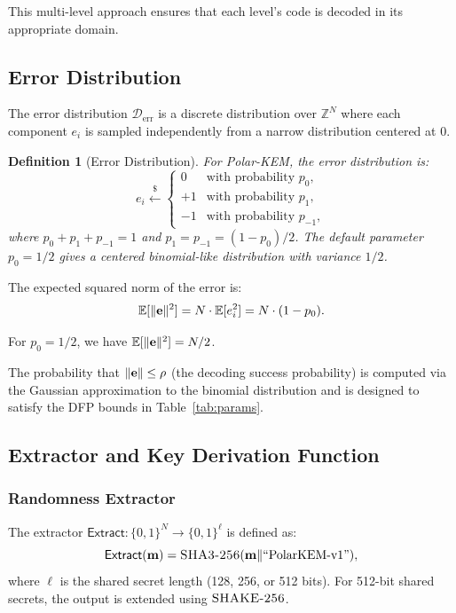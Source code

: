 \documentclass[11pt,a4paper]{article}
\newtheorem{definition}[theorem]{Definition}
\newcommand{\polarKem}{\textsf{Polar-KEM}\xspace}
\newcommand{\Extract}{\textsf{Extract}\xspace}
\newcommand{\DFP}{\textsf{DFP}\xspace}
\newcommand{\bit}{\{0,1\}}
\newcommand{\Z}{\mathbb{Z}}
\newcommand{\sample}{\xleftarrow{\$}}
\DeclarePairedDelimiter{\norm}{\lVert}{\rVert}
\begin{document}
This multi-level approach ensures that each level's code is decoded in its appropriate domain.

\subsection{Error Distribution}\label{sec:error-dist}

The error distribution $\mathcal{D}_{\text{err}}$ is a discrete distribution over $\Z^N$ where each component $e_i$ is sampled independently from a narrow distribution centered at 0.

\begin{definition}[Error Distribution]\label{def:error-dist}
For \polarKem, the error distribution is:
\[
e_i \sample \begin{cases}
0 & \text{with probability } p_0, \\
+1 & \text{with probability } p_1, \\
-1 & \text{with probability } p_{-1},
\end{cases}
\]
where $p_0 + p_1 + p_{-1} = 1$ and $p_1 = p_{-1} = (1 - p_0)/2$. The default parameter $p_0 = 1/2$ gives a centered binomial-like distribution with variance $1/2$.
\end{definition}

The expected squared norm of the error is:
\[
\mathbb{E}[\norm{\mathbf{e}}^2] = N \cdot \mathbb{E}[e_i^2] = N \cdot (1 - p_0).
\]

For $p_0 = 1/2$, we have $\mathbb{E}[\norm{\mathbf{e}}^2] = N/2$.

The probability that $\norm{\mathbf{e}} \leq \rho$ (the decoding success probability) is computed via the Gaussian approximation to the binomial distribution and is designed to satisfy the \DFP bounds in Table~\ref{tab:params}.

\subsection{Extractor and Key Derivation Function}\label{sec:extractor-kdf}

\subsubsection{Randomness Extractor}

The extractor $\Extract: \bit^N \to \bit^\ell$ is defined as:
\[
\Extract(\mathbf{m}) = \textsc{SHA3-256}(\mathbf{m} \| \text{``PolarKEM-v1''}),
\]
where $\ell$ is the shared secret length (128, 256, or 512 bits). For 512-bit shared secrets, the output is extended using $\textsc{SHAKE-256}$.
\end{document}
